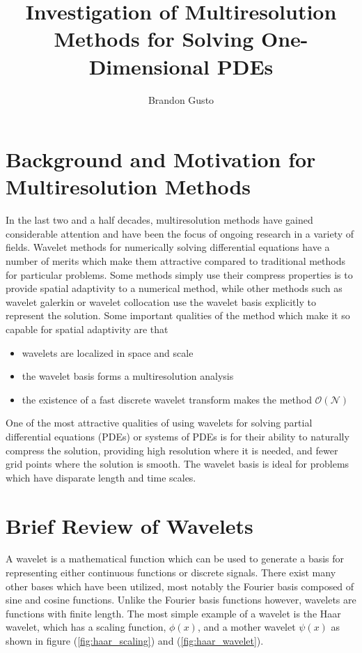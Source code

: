 \documentclass[11pt]{article}
\begin{document}
\title{Investigation of Multiresolution Methods for Solving One-Dimensional PDEs}
\author{Brandon Gusto \\}

\maketitle


\section{Background and Motivation for Multiresolution Methods}
In the last two and a half decades, multiresolution methods have gained considerable attention and have been the focus
of ongoing research in a variety of fields.
Wavelet methods for numerically solving differential equations have a number of merits which make them 
attractive compared to traditional methods for particular problems. Some methods simply use their compress properties
is to provide spatial adaptivity to a numerical method, while other methods such as wavelet galerkin or wavelet collocation
use the wavelet basis explicitly to represent the solution.
Some important qualities of the method which make it so capable for spatial adaptivity are that
\begin{itemize}
    \item wavelets are localized in space and scale
    \item the wavelet basis forms a multiresolution analysis
    \item the existence of a fast discrete wavelet transform makes the method $\mathcal{O}(\mathcal{N})$
\end{itemize} 
One of the most attractive qualities of using wavelets for solving partial differential equations (PDEs) 
or systems of PDEs is for their ability to naturally compress the solution, providing high resolution where 
it is needed, and fewer grid points where the solution is smooth. The wavelet basis is ideal for problems 
which have disparate length and time scales.


\section{Brief Review of Wavelets}
A wavelet is a mathematical function which can be used to generate a basis for representing either continuous functions or 
discrete signals. There exist many other bases which have been utilized, most notably the Fourier
basis composed of sine and cosine functions.
Unlike the Fourier basis functions however, wavelets are functions with finite length. The most simple example of a wavelet
is the Haar wavelet, which has a scaling function, $\phi(x)$, and a mother wavelet $\psi(x)$ as shown in 
figure (\ref{fig:haar_scaling}) and (\ref{fig:haar_wavelet}).
\end{document}
